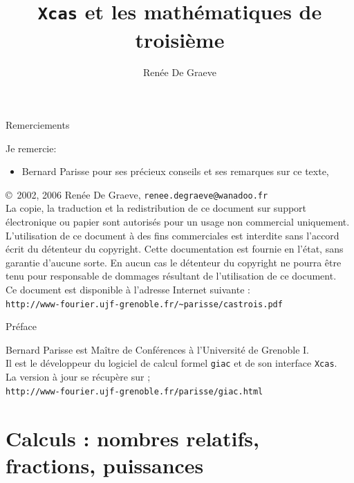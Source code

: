 \documentclass[a4paper,11pt]{book}
\title{{\tt Xcas} et les math\'ematiques de troisi\`eme}
\author{Ren\'ee De Graeve}
\begin{document}
\maketitle
{\bf \centerline{Remerciements}}

\vspace{1cm}

Je  remercie:
 \begin{itemize}
\item Bernard Parisse pour ses pr\'ecieux conseils et ses remarques sur ce 
texte,

 \end{itemize}

\vfill


\copyright\ 2002, 2006 Ren\'ee De Graeve, \verb|renee.degraeve@wanadoo.fr|\\
La copie, la traduction et la redistribution de ce document sur support 
\'electronique ou papier sont autoris\'es pour un usage non commercial 
uniquement.
L'utilisation de ce document \`a des fins commerciales est interdite
sans l'accord \'ecrit du d\'etenteur du copyright.
Cette documentation est fournie en l'\'etat, sans garantie d'aucune
sorte. En aucun cas le d\'etenteur du copyright ne pourra \^etre tenu
pour responsable de dommages r\'esultant de l'utilisation de ce
document.\\


Ce document est disponible à l'adresse Internet suivante :\\
\verb|http://www-fourier.ujf-grenoble.fr/~parisse/castrois.pdf|
\newpage 
{\bf \centerline{Pr\'eface}}

\vspace{1cm}

 
  Bernard Parisse est
Ma\^itre de Conf\'erences à l'Universit\'e de Grenoble I.\\
Il est le d\'eveloppeur du logiciel de calcul formel {\tt giac} et de son 
interface {\tt Xcas}.\\
La version \`a jour se r\'ecup\`ere sur ;\\
{\tt http://www-fourier.ujf-grenoble.fr/$\tilde{ }$parisse/giac.html}
\newpage
\tableofcontents
\newpage
\printindex
\chapter{Calculs : nombres relatifs, fractions, puissances}
\end{document}
